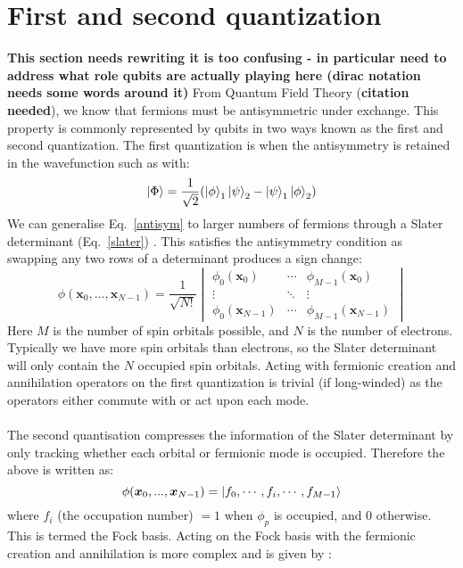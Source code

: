 \documentclass[twoside]{article}
\begin{document}
\section{First and second quantization}
\textbf{This section needs rewriting it is too confusing - in particular need to address what role qubits are actually playing here (dirac notation needs some words around it)}
From Quantum Field Theory (\textbf{citation needed}), we know that fermions must be antisymmetric under exchange. This property is commonly represented by qubits in two ways known as the first and second quantization. The first quantization is when the antisymmetry is retained in the wavefunction such as with:
\begin{equation}\label{antisym}
        \ket{\Phi} = \frac{1}{\sqrt{2}}(\ket{\phi}_1 \ket{\psi}_2 - \ket{\psi}_1 \ket{\phi}_2)
\end{equation}
We can generalise Eq.~\ref{antisym} to larger numbers of fermions through a Slater determinant (Eq.~\ref{slater}) \cite{chemistryReview}. This satisfies the antisymmetry condition as swapping any two rows of a determinant produces a sign change:
\begin{equation}\label{slater}
        \phi(\bm x_0, ..., \bm x_{N-1}) = \frac{1}{\sqrt{N!}} 
        \begin{vmatrix} 
                \phi_0(\bm x_0) & \cdots & \phi_{M-1}(\bm x_0)\\
                \vdots & \ddots & \vdots \\
                \phi_0(\bm x_{N-1}) & \cdots & \phi_{M-1}(\bm x_{N-1})
        \end{vmatrix}
\end{equation}
Here $M$ is the number of spin orbitals possible, and $N$ is the number of electrons. Typically we have more spin orbitals than electrons, so the Slater determinant will only contain the $N$ occupied spin orbitals. Acting with fermionic creation and annihilation operators on the first quantization is trivial (if long-winded) as the operators either commute with or act upon each mode. \\\\
The second quantisation compresses the information of the Slater determinant by only tracking whether each orbital or fermionic mode is occupied. Therefore the above is written as:
\begin{equation}
        \phi(\bm x_0, ..., \bm x_{N-1}) = \ket{f_0,\cdots, f_i, \cdots, f_{M-1}}
\end{equation}
where $f_i$ (the occupation number) $ =1$ when $\phi_p$ is occupied, and 0 otherwise. This is termed the Fock basis. Acting on the Fock basis with the fermionic creation and annihilation is more complex and is given by \cite{chemistryReview}:
\end{document}
